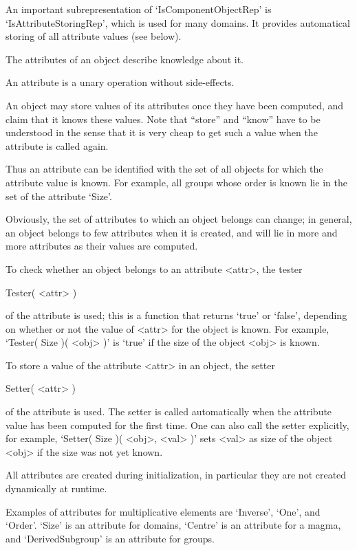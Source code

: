 An important subrepresentation of `IsComponentObjectRep' is
`IsAttributeStoringRep', which is used for many domains.
It provides automatical storing of all attribute values (see below).



The attributes of an object describe knowledge about it.

An attribute is a unary operation without side-effects.

An object may store values of its attributes once they have been
computed, and claim that it knows these values.
Note that ``store'' and ``know'' have to be understood in the sense that 
it is very cheap to get such a value when the attribute is called again.


Thus an attribute can be identified with the set of all objects for which
the attribute value is known.
For example, all groups whose order is known lie in the set of the
attribute `Size'.

Obviously, the set of attributes to which an object belongs can change;
in general, an object belongs to few attributes when it is created,
and will lie in more and more attributes as their values are computed.

To check whether an object belongs to an attribute <attr>,
the tester

\>Tester( <attr> )

of the attribute is used;
this is a function that returns `true' or `false',
depending on whether or not the value of <attr> for the object is known.
For example, `Tester( Size )( <obj> )' is `true' if the size of the object
<obj> is known.

To store a value of the attribute <attr> in an object,
the setter

\>Setter( <attr> )

of the attribute is used.
The setter is called automatically when the attribute value has been
computed for the first time.
One can also call the setter explicitly,
for example, `Setter( Size )( <obj>, <val> )' sets <val> as size of the
object <obj> if the size was not yet known.

All attributes are created during initialization,
in particular they are not created dynamically at runtime.

Examples of attributes for multiplicative elements are `Inverse', `One',
and `Order'.
`Size' is an attribute for domains, `Centre' is an attribute for a magma,
and `DerivedSubgroup' is an attribute for groups.

